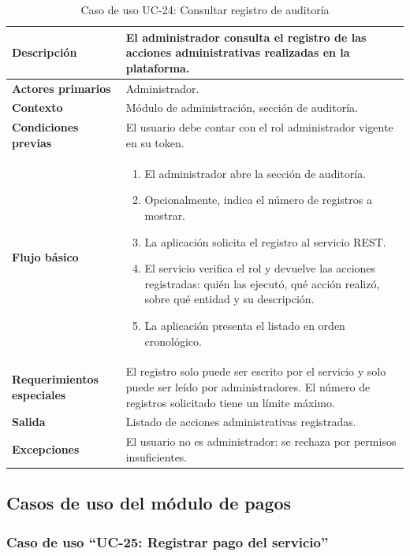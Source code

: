\documentclass[doc,12pt,a4paper]{apa7}
\begin{document}
\begin{longtable}{|P{3.3cm}|L{11.2cm}|}
\caption{Caso de uso UC-24: Consultar registro de auditoría}\\
\hline
\textbf{Descripción} & El administrador consulta el registro de las acciones administrativas realizadas en la plataforma. \\ \hline
\textbf{Actores primarios} & Administrador. \\ \hline
\textbf{Contexto} & Módulo de administración, sección de auditoría. \\ \hline
\textbf{Condiciones previas} & El usuario debe contar con el rol administrador vigente en su token. \\ \hline
\textbf{Flujo básico} &
\begin{enumerate}
    \item El administrador abre la sección de auditoría.
    \item Opcionalmente, indica el número de registros a mostrar.
    \item La aplicación solicita el registro al servicio REST.
    \item El servicio verifica el rol y devuelve las acciones registradas: quién las ejecutó, qué acción realizó, sobre qué entidad y su descripción.
    \item La aplicación presenta el listado en orden cronológico.
\end{enumerate} \\ \hline
\textbf{Requerimientos especiales} & El registro solo puede ser escrito por el servicio y solo puede ser leído por administradores. El número de registros solicitado tiene un límite máximo. \\ \hline
\textbf{Salida} & Listado de acciones administrativas registradas. \\ \hline
\textbf{Excepciones} & El usuario no es administrador: se rechaza por permisos insuficientes. \\ \hline
\end{longtable}

\subsection{Casos de uso del módulo de pagos}

\subsubsection{Caso de uso ``UC-25: Registrar pago del servicio''}
\end{document}
